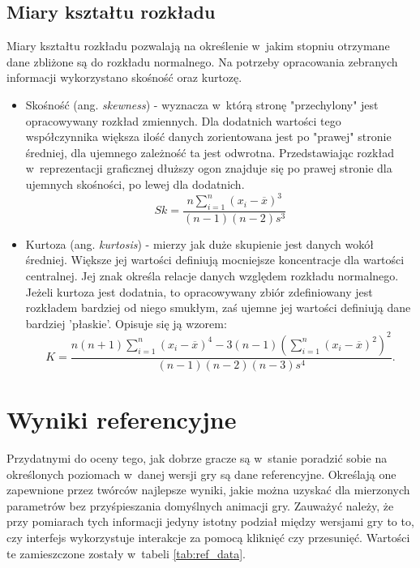 \documentclass[a4paper,12pt,numbers=noenddot]{report}
\begin{document}
\subsection{Miary kształtu rozkładu}
Miary kształtu rozkładu pozwalają na określenie w~jakim stopniu otrzymane dane zbliżone są do rozkładu normalnego. Na potrzeby opracowania zebranych informacji wykorzystano skośność oraz kurtozę.

\begin{itemize}
\item
Skośność (ang. \textit{skewness}) - wyznacza w~którą stronę "przechylony" jest opracowywany rozkład zmiennych. Dla dodatnich wartości tego współczynnika większa ilość danych zorientowana jest po "prawej" stronie średniej, dla ujemnego zależność ta jest odwrotna. Przedstawiając rozkład w~reprezentacji graficznej dłuższy ogon znajduje się po prawej stronie dla ujemnych skośności, po lewej dla dodatnich.
\begin{equation}
\label{eq_skew}
Sk = \frac{n\sum_{i=1}^{n}(x_i-\overline{x})^3}{(n-1)(n-2)s^3}
\end{equation}

\item
Kurtoza (ang. \textit{kurtosis}) - mierzy jak duże skupienie jest danych wokół średniej. Większe jej wartości definiują mocniejsze koncentracje dla wartości centralnej. Jej znak określa relacje danych względem rozkładu normalnego. Jeżeli kurtoza jest dodatnia, to opracowywany zbiór zdefiniowany jest rozkładem bardziej od niego smukłym, zaś ujemne jej wartości definiują dane bardziej 'płaskie'. Opisuje się ją wzorem:
\begin{equation}
\label{eq_kurtosis}
K = \frac{n(n+1)\sum_{i=1}^{n}(x_i-\overline{x})^4-3(n-1)(\sum_{i=1}^{n}(x_i-\overline{x})^2)^2}{(n-1)(n-2)(n-3)s^4}.
\end{equation}
\end{itemize}

\section{Wyniki referencyjne}
Przydatnymi do oceny tego, jak dobrze gracze są w~stanie poradzić sobie na określonych poziomach w~danej wersji gry są dane referencyjne. Określają one zapewnione przez twórców najlepsze wyniki, jakie można uzyskać dla mierzonych parametrów bez przyśpieszania domyślnych animacji gry. Zauważyć należy, że przy pomiarach tych informacji jedyny istotny podział między wersjami gry to to, czy interfejs wykorzystuje interakcje za pomocą kliknięć czy przesunięć. Wartości te zamieszczone zostały w~tabeli \ref{tab:ref_data}.
\end{document}
